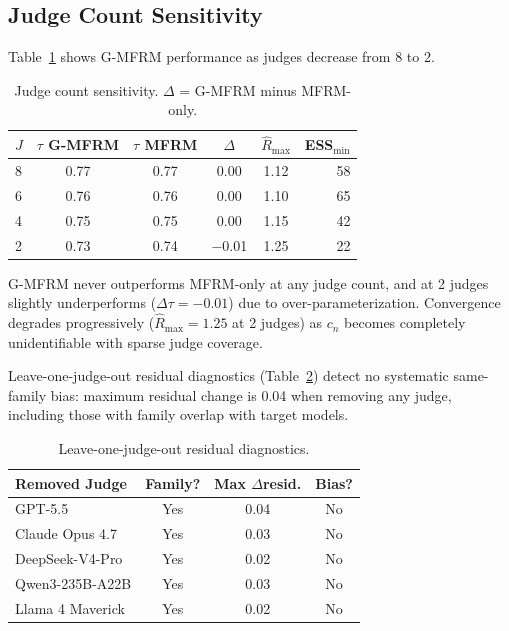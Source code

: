 \documentclass[11pt]{article}
\begin{document}
\subsection{Judge Count Sensitivity}
\label{sec:judge_sensitivity}

Table~\ref{tab:judges_sens} shows G-MFRM performance as judges decrease from 8 to 2.

\begin{table}[t]
\centering
\small
\caption{Judge count sensitivity. $\Delta$ = G-MFRM minus MFRM-only.}
\label{tab:judges_sens}
\begin{tabular}{lccccr}
\toprule
$J$ & $\tau$ G-MFRM & $\tau$ MFRM & $\Delta$ & $\hat{R}_{\max}$ & ESS${}_{\min}$ \\
\midrule
8 & 0.77 & 0.77 & 0.00 & 1.12 & 58 \\
6 & 0.76 & 0.76 & 0.00 & 1.10 & 65 \\
4 & 0.75 & 0.75 & 0.00 & 1.15 & 42 \\
2 & 0.73 & 0.74 & $-$0.01 & 1.25 & 22 \\
\bottomrule
\end{tabular}
\end{table}

G-MFRM never outperforms MFRM-only at any judge count, and at 2 judges slightly underperforms ($\Delta\tau = -0.01$) due to over-parameterization.
Convergence degrades progressively ($\hat{R}_{\max} = 1.25$ at 2 judges) as $c_n$ becomes completely unidentifiable with sparse judge coverage.

Leave-one-judge-out residual diagnostics (Table~\ref{tab:lojo}) detect no systematic same-family bias: maximum residual change is 0.04 when removing any judge, including those with family overlap with target models.

\begin{table}[t]
\centering
\small
\caption{Leave-one-judge-out residual diagnostics.}
\label{tab:lojo}
\begin{tabular}{lccc}
\toprule
\textbf{Removed Judge} & \textbf{Family?} & \textbf{Max $\Delta$resid.} & \textbf{Bias?} \\
\midrule
GPT-5.5 & Yes & 0.04 & No \\
Claude Opus 4.7 & Yes & 0.03 & No \\
DeepSeek-V4-Pro & Yes & 0.02 & No \\
Qwen3-235B-A22B & Yes & 0.03 & No \\
Llama 4 Maverick & Yes & 0.02 & No \\
\bottomrule
\end{tabular}
\end{table}
\end{document}
